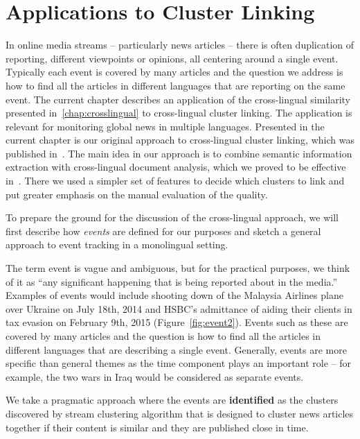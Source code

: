 %
\chapter{Applications to Cluster Linking}\label{chap:applications}

In online media streams -- particularly news articles -- there is often duplication of reporting,
different viewpoints or opinions, all centering around a single event. Typically each event is covered by many articles
and the question we address is how to find all the articles in different languages that are reporting on the same event.
The current chapter describes an application of the cross-lingual similarity presented in~\ref{chap:crosslingual}
to cross-lingual cluster linking. The application is relevant for monitoring global news in multiple languages.
Presented in the current chapter is our original approach to cross-lingual cluster linking, 
which was published in~\cite{2015arXiv151207046R}. The main idea in our approach is to combine
semantic information extraction with cross-lingual document analysis, which we proved to be
effective in~\cite{Belyaeva201564}. There we used a simpler set of features to 
decide which clusters to link and put greater emphasis on the manual evaluation of the quality. 

To prepare the ground for the discussion of the cross-lingual approach, we will first
describe how \emph{events} are defined for our purposes and  
sketch a general approach to event tracking in a monolingual setting.

The term event is vague and ambiguous, but for the practical purposes,
we think of it as ``any significant happening that is being reported about in the media.''
Examples of events would include shooting down of the Malaysia Airlines plane over Ukraine
on July 18th, 2014 and HSBC's admittance of aiding their clients in tax evasion on
February 9th, 2015 (Figure~\ref{fig:event2}). Events such as these are covered by many
articles and the question is how to find all the articles in different languages
that are describing a single event. Generally, events are more specific than
general themes as the time component plays an important role -- for example,
the two wars in Iraq would be considered as separate events.

We take a pragmatic approach where the events are \textbf{identified} as the clusters
discovered by stream clustering algorithm that is designed to cluster
news articles together if their content is similar and they are published
close in time. 

